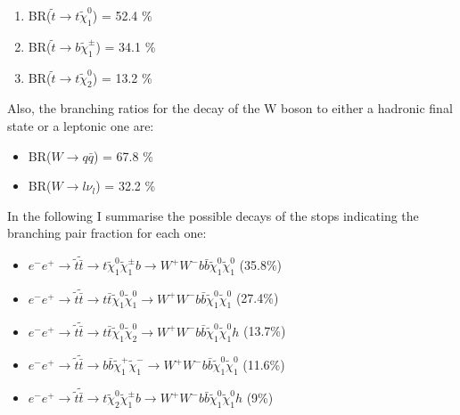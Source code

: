 \documentclass[12pt,a4paper]{report}
\begin{document}
\newpage

\begin{enumerate}
 \item BR($\tilde{t}\rightarrow t \tilde{\chi}_{1}^{0}$) = 52.4 \%
 \item BR($\tilde{t}\rightarrow b \tilde{\chi}_{1}^{\pm}$) = 34.1 \%
 \item BR($\tilde{t}\rightarrow t \tilde{\chi}_{2}^{0}$) = 13.2 \%
 \end{enumerate}

Also, the branching ratios for the decay of the W boson to either a hadronic final state or 
a leptonic one are:

\begin{itemize}
 \item BR($W\rightarrow q\bar{q}$) = 67.8 \% 
 \item BR($W\rightarrow l\nu_{l}$) = 32.2 \%
\end{itemize}

In the following I summarise the possible decays of the stops indicating the branching pair fraction
for each one:

\begin{itemize}
 \item $e^{-}e^{+} \rightarrow \tilde{t}\tilde{\bar{t}} \rightarrow t \tilde{\chi}_{1}^{0}
 \tilde{\chi}^{\pm}_{1}b \rightarrow
 W^{+}W^{-} b \bar{b} \tilde{\chi}_{1}^{0}  \tilde{\chi}_{1}^{0}$ \quad (35.8\%)

 \item $e^{-}e^{+} \rightarrow \tilde{t}\tilde{\bar{t}} \rightarrow t\bar{t} \tilde{\chi}_{1}^{0}
 \tilde{\chi}^{0}_{1} \rightarrow
 W^{+}W^{-} b \bar{b} \tilde{\chi}_{1}^{0}  \tilde{\chi}_{1}^{0}$ \quad (27.4\%)

 \item $e^{-}e^{+} \rightarrow \tilde{t}\tilde{\bar{t}} \rightarrow t\bar{t} \tilde{\chi}_{1}^{0}
 \tilde{\chi}^{0}_{2} \rightarrow
 W^{+}W^{-} b \bar{b} \tilde{\chi}_{1}^{0}  \tilde{\chi}_{1}^{0}h$ \quad (13.7\%)
 
 \item $e^{-}e^{+} \rightarrow \tilde{t}\tilde{\bar{t}} \rightarrow b\bar{b} \tilde{\chi}_{1}^{+}
 \tilde{\chi}^{-}_{1} \rightarrow
 W^{+}W^{-} b \bar{b} \tilde{\chi}_{1}^{0}  \tilde{\chi}_{1}^{0}$ \quad (11.6\%)
 
 \item $e^{-}e^{+} \rightarrow \tilde{t}\tilde{\bar{t}} \rightarrow t \tilde{\chi}_{2}^{0}
 \tilde{\chi}^{\pm}_{1}b \rightarrow
 W^{+}W^{-} b \bar{b} \tilde{\chi}_{1}^{0}  \tilde{\chi}_{1}^{0}h$ \quad (9\%)
 
 \end{itemize}
 
\end{document}
